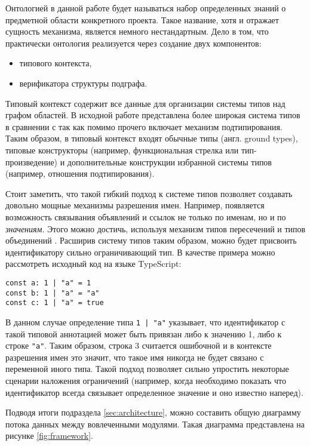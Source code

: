 Онтологией в данной работе будет называться набор определенных знаний о предметной области конкретного проекта.
Такое название, хотя и отражает сущность механизма, является немного нестандартным. Дело в том, что
практически онтология реализуется через создание двух компонентов:
\begin{itemize}
    \item типового контекста,
    \item верификатора структуры подграфа.
\end{itemize}

Типовый контекст содержит все данные для организации системы типов над графом областей. В исходной работе \cite{scope-graphs-typed}
представлена более широкая система типов в сравнении с \cite{scope-graphs-static-analysis} так как помимо прочего включает
механизм подтипирования. Таким образом, в типовый контекст входят обычные типы (англ. ground types), типовые конструкторы
(например, функциональная стрелка или тип-произведение) и дополнительные конструкции избранной системы типов (например, отношения подтипирования).

Стоит заметить, что такой гибкий подход к системе типов позволяет создавать довольно мощные механизмы разрешения имен. Например,
появляется возможность связывания объявлений и ссылок не только по именам, но и по \textit{значениям}. Этого можно достичь, используя
механизм типов пересечений и типов объединений \cite{DEZANICIANCAGLINI1992303}.
Расширив систему типов таким образом, можно будет присвоить идентификатору сильно ограничивающий тип. В качестве примера можно рассмотреть
исходный код на языке TypeScript:
\begin{verbatim}
const a: 1 | "a" = 1
const b: 1 | "a" = "a"
const c: 1 | "a" = true
\end{verbatim}

В данном случае определение типа \texttt{1 | "a"} указывает, что идентификатор с такой типовой аннотацией может быть
привязан либо к значению 1, либо к строке \texttt{"a"}. Таким образом, строка 3 считается ошибочной и в контексте
разрешения имен это значит, что такое имя никогда не будет связано с переменной иного типа. Такой подход позволяет
сильно упростить некоторые сценарии наложения ограничений (например, когда необходимо показать что идентификатор всегда связывает
определенное значение и оно известно наперед).


Подводя итоги подраздела \ref{sec:architecture}, можно составить общую диаграмму потока данных между вовлеченными модулями. Такая
диаграмма представлена на рисунке \ref{fig:framework}.

